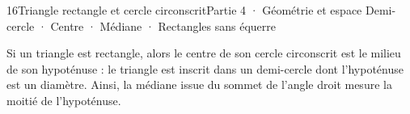 \begin{ouverture}[cercle]{16}{Triangle rectangle et cercle circonscrit}{Partie 4 · Géométrie et espace}
{Demi-cercle · Centre · Médiane · Rectangles sans équerre}
\end{ouverture}
\pagestyle{otMain}\essentiel\fontsize{11}{15}\selectfont
{}\label{cours-16-1}
\begin{theoreme}Si un triangle est rectangle, alors le centre de son cercle circonscrit est le milieu de son hypoténuse : le triangle est inscrit dans un demi-cercle dont l’hypoténuse est un diamètre. Ainsi, la médiane issue du sommet de l’angle droit mesure la moitié de l’hypoténuse.\end{theoreme}
\label{fig-cours-16-1-cours-cercle}

